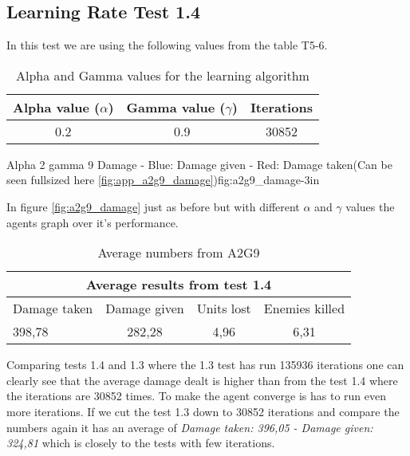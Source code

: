 \subsection*{Learning Rate Test 1.4}
In this test we are using the following values from the table T5-6.



\begin{table}[H]
\begin{centering}
 \begin{tabular}{|c|c|c|}
	\hline
		Alpha value ($\alpha$) & Gamma value ($\gamma$) & Iterations\\
	\hline
		0.2 & 0.9 & 30852 \\
	\hline
\end{tabular}
\label{a2g9_table}
\caption{Alpha and Gamma values for the learning algorithm}
\end{centering}
\end{table}


			{Alpha 2 gamma 9 Damage - Blue: Damage given - Red: Damage taken(Can be seen fullsized here \ref{fig:app_a2g9_damage})}{fig:a2g9_damage}{-3in}

In figure \ref{fig:a2g9_damage} just as before but with different $\alpha$ and $\gamma$ values the agents graph over it's performance.




\begin{table}
\begin{centering}

 \begin{tabular}{|l|c|c|c|}
	\multicolumn{4}{c}{Average results from test 1.4} \\
	\hline
		Damage taken & Damage given & Units lost & Enemies killed\\
	\hline
		398,78 & 282,28 & 4,96 & 6,31 \\
		\hline
\end{tabular}

\label{test1.4}
\caption{Average numbers from A2G9}
\end{centering}

\end{table}


Comparing tests 1.4 and 1.3 where the 1.3 test has run 135936 iterations one can clearly see that the average damage dealt is higher than from the test 1.4 where the iterations are 30852 times. To make the agent converge is has to run even more iterations. If we cut the test 1.3 down to 30852 iterations and compare the numbers again it has an average of \textit{Damage taken: 396,05 - Damage given: 324,81} which is closely to the tests with few iterations.\\